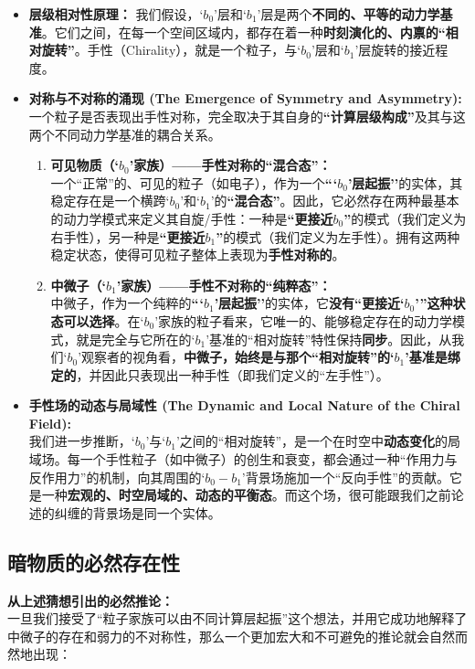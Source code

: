 \documentclass[12pt]{article}
\begin{document}
\begin{itemize}
    \item \textbf{层级相对性原理：} 我们假设，`$b_0$'层和`$b_1$'层是两个\textbf{不同的、平等的动力学基准}。它们之间，在每一个空间区域内，都存在着一种\textbf{时刻演化的、内禀的``相对旋转''}。手性（Chirality），就是一个粒子，与`$b_0$'层和`$b_1$'层旋转的接近程度。

    \item \textbf{对称与不对称的涌现 (The Emergence of Symmetry and Asymmetry):} \\
    一个粒子是否表现出手性对称，完全取决于其自身的\textbf{``计算层级构成''}及其与这两个不同动力学基准的耦合关系。
    \begin{enumerate}
        \item \textbf{可见物质（`$b_0$'家族）——手性对称的``混合态''：}\\
        一个``正常''的、可见的粒子（如电子），作为一个\textbf{```$b_0$'层起振''}的实体，其稳定存在是一个横跨`$b_0$'和`$b_1$'的\textbf{``混合态''}。因此，它必然存在两种最基本的动力学模式来定义其自旋/手性：一种是\textbf{``更接近$b_0$''}的模式（我们定义为右手性），另一种是\textbf{``更接近$b_1$''}的模式（我们定义为左手性）。拥有这两种稳定状态，使得可见粒子整体上表现为\textbf{手性对称的}。

        \item \textbf{中微子（`$b_1$'家族）——手性不对称的``纯粹态''：}\\
        中微子，作为一个纯粹的\textbf{```$b_1$'层起振''}的实体，它\textbf{没有``更接近`$b_0$'''这种状态可以选择}。在`$b_0$'家族的粒子看来，它唯一的、能够稳定存在的动力学模式，就是完全与它所在的`$b_1$'基准的``相对旋转''特性保持\textbf{同步}。因此，从我们`$b_0$'观察者的视角看，\textbf{中微子，始终是与那个``相对旋转''的`$b_1$'基准是绑定的}，并因此只表现出一种手性（即我们定义的``左手性''）。
    \end{enumerate}

    \item \textbf{手性场的动态与局域性 (The Dynamic and Local Nature of the Chiral Field):}\\
    我们进一步推断，`$b_0$'与`$b_1$'之间的``相对旋转''，是一个在时空中\textbf{动态变化}的局域场。每一个手性粒子（如中微子）的创生和衰变，都会通过一种``作用力与反作用力''的机制，向其周围的`$b_0-b_1$'背景场施加一个``反向手性''的贡献。它是一种\textbf{宏观的、时空局域的、动态的平衡态}。而这个场，很可能跟我们之前论述的纠缠的背景场是同一个实体。
\end{itemize}

\subsection{暗物质的必然存在性}
\noindent\textbf{从上述猜想引出的必然推论：}\\
一旦我们接受了``粒子家族可以由不同计算层起振''这个想法，并用它成功地解释了中微子的存在和弱力的不对称性，那么一个更加宏大和不可避免的推论就会自然而然地出现：
\end{document}
